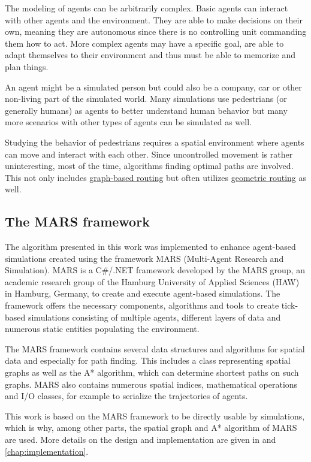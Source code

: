 	The modeling of agents can be arbitrarily complex.
	Basic agents can interact with other agents and the environment.
	They are able to make decisions on their own, meaning they are autonomous since there is no controlling unit commanding them how to act.
	More complex agents may have a specific goal, are able to adapt themselves to their environment and thus must be able to memorize and plan things.
	
	An agent might be a simulated person but could also be a company, car or other non-living part of the simulated world.
	Many simulations use pedestrians (or generally humans) as agents to better understand human behavior but many more scenarios with other types of agents can be simulated as well\cite{macal-introductory-tutorial}.

	Studying the behavior of pedestrians requires a spatial environment where agents can move and interact with each other.
	Since uncontrolled movement is rather uninteresting, most of the time, algorithms finding optimal paths are involved\cite{kneidl-borrmann-hartmann-navigation,gloor-hybrid-pedestrian-routing,teknomo-millonig-routing}.
	This not only includes \hyperref[sec:graph-routing]{graph-based routing} but often utilizes \hyperref[sec:geometric-routing]{geometric routing} as well\cite{kneidl-borrmann-hartmann-navigation}.
	
	\subsection{The MARS framework}
	
		The algorithm presented in this work was implemented to enhance agent-based simulations created using the framework MARS (Multi-Agent Research and Simulation).
		MARS is a C\#/.NET framework developed by the MARS group, an academic research group of the Hamburg University of Applied Sciences (HAW) in Hamburg, Germany, to create and execute agent-based simulations\cite{mars}.
		The framework offers the necessary components, algorithms and tools to create tick-based simulations consisting of multiple agents, different layers of data and numerous static entities populating the environment.
		
		The MARS framework contains several data structures and algorithms for spatial data and especially for path finding.
		This includes a class representing spatial graphs as well as the A* algorithm, which can determine shortest paths on such graphs.
		MARS also contains numerous spatial indices, mathematical operations and I/O classes, for example to serialize the trajectories of agents.
		 
		This work is based on the MARS framework to be directly usable by simulations, which is why, among other parts, the spatial graph and A* algorithm of MARS are used.
		More details on the design and implementation are given in  and \ref{chap:implementation}.
